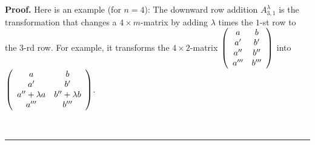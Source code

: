 \documentclass[numbers=enddot,12pt,final,onecolumn,notitlepage]{scrartcl}%
\theoremstyle{definition}
\newenvironment{proof}[1][Proof]{\noindent\textbf{#1.} }{\ \rule{0.5em}{0.5em}}
\begin{document}
\begin{proof}
Here is an example (for $n = 4$): The downward row addition $A^{\lambda}%
_{3,1}$ is the transformation that changes a $4\times m$-matrix by adding
$\lambda$ times the $1$-st row to the $3$-rd row. For example, it transforms
the $4 \times2$-matrix $\left(
\begin{array}
[c]{cc}%
a & b\\
a^{\prime} & b^{\prime}\\
a^{\prime\prime} & b^{\prime\prime}\\
a^{\prime\prime\prime} & b^{\prime\prime\prime}%
\end{array}
\right)  $ into $\left(
\begin{array}
[c]{cc}%
a & b\\
a^{\prime} & b^{\prime}\\
a^{\prime\prime}+ \lambda a & b^{\prime\prime}+ \lambda b\\
a^{\prime\prime\prime} & b^{\prime\prime\prime}%
\end{array}
\right)  $.



\end{proof}
\end{document}

